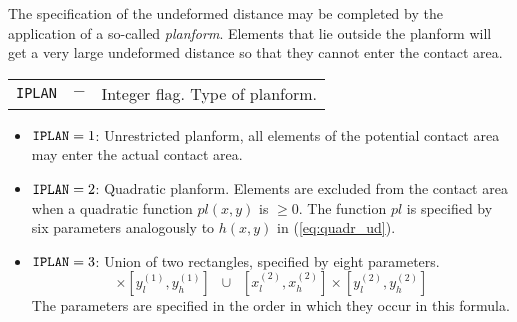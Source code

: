 \documentclass[12pt]{report}
\renewcommand{\magenta}[1]{}
\newenvironment{inputvars}{\vspace{0.4\baselineskip}%

\begin{tabular}{>{\raggedright}p{22mm}p{19mm}p{113mm}}}{
\end{tabular}

}
\newcommand{\inpvar}[3]{{\small\tt #1} & $#2$ & #3 \\[1ex]}
\begin{document}
The specification of the undeformed distance may be completed by the
application of a so-called {\em planform}. Elements that lie outside the
planform will get a very large undeformed distance so that they cannot
enter the contact area.
\begin{inputvars}
\inpvar{IPLAN}{-}{Integer flag. Type of planform.}
\end{inputvars}
\vspace{-2ex}
\begin{itemize}
\item ${\tt IPLAN}=1$: Unrestricted planform, all elements of the potential
        contact area may enter the actual contact area.
\item ${\tt IPLAN}=2$: Quadratic planform. Elements are excluded from the
        contact area when a qua\-dra\-tic function $pl(x,y)$ is $\ge 0$. The
        function $pl$ is specified by six parameters analogously to $h(x,y)$
        in (\ref{eq:quadr_ud}).
\item ${\tt IPLAN}=3$: Union of two rectangles, specified by eight parameters.
\begin{equation}
        [ x_l^{(1)}, x_h^{(1)} ] \times [ y_l^{(1)}, y_h^{(1)} ]
        \;\; \cup \;\;
        [ x_l^{(2)}, x_h^{(2)} ] \times [ y_l^{(2)}, y_h^{(2)} ]
\end{equation}
The parameters are specified in the order in which they occur in this
formula.
\magenta{
\item ${\tt IPLAN}=4$: Weighted interaction between $n_{patch}$ different
contact patches. Contact patches are separated at given
$y_{i\text{--}i+1}$-values. The effect of pressures on normal displacements
of different patches is multiplied by factors $f_{i,j}\in[0,1]$, e.g.\
\begin{equation}
        n_{patch} = 3, \;\;
        \vec{y} = \left[ \begin{array}{c} 
                         y_{1\text{--}2} \\ y_{2\text{--}3} 
                  \end{array} \right] , \;\;
        \mat{F} = \left[ \begin{array}{ccc}
                                1 & f_{1,2} & f_{1,3} \\
                                * &   1     & f_{2,3} \\
                                * &   *     &    1      \end{array} \right] .
\end{equation}
The $y$-values must be strictly increasing, i.e.\ $y_{1\text{--}2} < 
y_{2\text{--}3}$. The matrix $\mat{F}$ is symmetrical and may usually be
tridiagonal. The multiplication factors $f$ are retrieved in row-wise
order: $f_{1,2}, f_{1,3}, f_{2,3}$.
}
\end{itemize}
\end{document}
